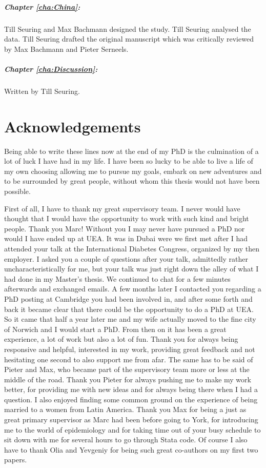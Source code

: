 \paragraph{Chapter \ref{cha:China}:} Till Seuring and Max Bachmann designed the study. Till Seuring analysed the data. Till Seuring drafted the original manuscript which was critically reviewed by Max Bachmann and Pieter Serneels.

\paragraph{Chapter \ref{cha:Discussion}:} Written by Till Seuring.
\cleardoublepage

\chapter*{\label{acknowledgements}Acknowledgements}

Being able to write these lines now at the end of my PhD is the culmination of a lot of luck I have had in my life. I have been so lucky to be able to live a life of my own choosing allowing me to pursue my goals, embark on new adventures and to be surrounded by great people, without whom this thesis would not have been possible. 

First of all, I have to thank my great supervisory team. I never would have thought that I would have the opportunity to work with such kind and bright people. Thank you Marc! Without you I may never have pursued a PhD nor would I have ended up at UEA. It was in Dubai were we first met after I had attended your talk at the International Diabetes Congress, organized by my then employer. I asked you a couple of questions after your talk, admittedly rather uncharacteristically for me, but your talk was just right down the alley of what I had done in my Master's thesis. We continued to chat for a few minutes afterwards and exchanged emails. A few months later I contacted you regarding a PhD posting at Cambridge you had been involved in, and after some forth and back it became clear that there could be the opportunity to do a PhD at UEA. So it came that half a year later me and my wife actually moved to the fine city of Norwich and I would start a PhD. From then on it has been a great experience, a lot of work but also a lot of fun. Thank you for always being responsive and helpful, interested in my work, providing great feedback and not hesitating one second to also support me from afar. The same has to be said of Pieter and Max, who became part of the supervisory team more or less at the middle of the road. Thank you Pieter for always pushing me to make my work better, for providing me with new ideas and for always being there when I had a question. I also enjoyed finding some common ground on the experience of being married to a women from Latin America. Thank you Max for being a just as great primary supervisor as Marc had been before going to York, for introducing me to the world of epidemiology and for taking time out of your busy schedule to sit down with me for several hours to go through Stata code. Of course I also have to thank Olia and Yevgeniy for being such great co-authors on my first two papers.

